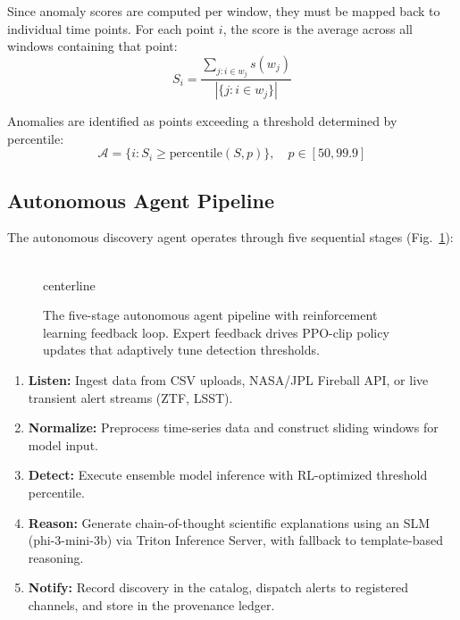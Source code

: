\documentclass[conference]{IEEEtran}
\begin{document}
Since anomaly scores are computed per window, they must be mapped back to individual time points. For each point $i$, the score is the average across all windows containing that point:
\begin{equation}
S_i = \frac{\sum_{j: i \in w_j} s(w_j)}{|\{j : i \in w_j\}|}
\end{equation}

Anomalies are identified as points exceeding a threshold determined by percentile:
\begin{equation}
\mathcal{A} = \{i : S_i \geq \text{percentile}(S, p)\}, \quad p \in [50, 99.9]
\end{equation}

\subsection{Autonomous Agent Pipeline}

The autonomous discovery agent operates through five sequential stages (Fig.~\ref{fig:agent}):

\begin{figure}[htbp]
\\centerline{
}
\caption{The five-stage autonomous agent pipeline with reinforcement learning feedback loop. Expert feedback drives PPO-clip policy updates that adaptively tune detection thresholds.}
\label{fig:agent}
\end{figure}

\begin{enumerate}
    \item \textbf{Listen:} Ingest data from CSV uploads, NASA/JPL Fireball API, or live transient alert streams (ZTF, LSST).
    \item \textbf{Normalize:} Preprocess time-series data and construct sliding windows for model input.
    \item \textbf{Detect:} Execute ensemble model inference with RL-optimized threshold percentile.
    \item \textbf{Reason:} Generate chain-of-thought scientific explanations using an SLM (phi-3-mini-3b) via Triton Inference Server, with fallback to template-based reasoning.
    \item \textbf{Notify:} Record discovery in the catalog, dispatch alerts to registered channels, and store in the provenance ledger.
\end{enumerate}
\end{document}
